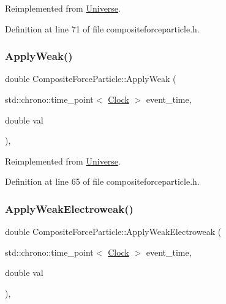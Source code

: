 Reimplemented from \mbox{\hyperlink{class_universe_af7becebb347be9a85541d96a3eca1ca7}{Universe}}.



Definition at line 71 of file compositeforceparticle.\+h.

\mbox{\label{class_composite_force_particle_a1fd171a0c6fab0cbf9a45a0d24607bde}} 
\subsubsection{\texorpdfstring{Apply\+Weak()}{ApplyWeak()}}
{\footnotesize\ttfamily double Composite\+Force\+Particle\+::\+Apply\+Weak (\begin{DoxyParamCaption}\item[{std\+::chrono\+::time\+\_\+point$<$ \mbox{\hyperlink{universe_8h_a0ef8d951d1ca5ab3cfaf7ab4c7a6fd80}{Clock}} $>$}]{event\+\_\+time,  }\item[{double}]{val }\end{DoxyParamCaption})\hspace{0.3cm}{\ttfamily [inline]}, {\ttfamily [virtual]}}



Reimplemented from \mbox{\hyperlink{class_universe_a6d1226b3adec3c42a833afdbb6a65a92}{Universe}}.



Definition at line 65 of file compositeforceparticle.\+h.

\mbox{\label{class_composite_force_particle_a3c1c0b427c633f0685f1d812e02b92ff}} 
\subsubsection{\texorpdfstring{Apply\+Weak\+Electroweak()}{ApplyWeakElectroweak()}}
{\footnotesize\ttfamily double Composite\+Force\+Particle\+::\+Apply\+Weak\+Electroweak (\begin{DoxyParamCaption}\item[{std\+::chrono\+::time\+\_\+point$<$ \mbox{\hyperlink{universe_8h_a0ef8d951d1ca5ab3cfaf7ab4c7a6fd80}{Clock}} $>$}]{event\+\_\+time,  }\item[{double}]{val }\end{DoxyParamCaption})\hspace{0.3cm}{\ttfamily [inline]}, {\ttfamily [virtual]}}



